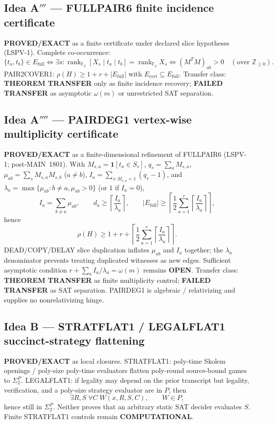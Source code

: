 \documentclass[11pt]{article}
\begin{document}
\subsection*{Idea A$'''$ --- FULLPAIR6 finite incidence certificate}
\textbf{PROVED/EXACT} as a finite certificate under declared slice hypotheses
(LSPV-1). Complete co-occurrence:
\[
\{t_a,t_b\}\in E_{\mathrm{full}}
\iff
\exists s:\operatorname{rank}_{\mathbb F_2}[X_s\mid t_a\mid t_b]
=\operatorname{rank}_{\mathbb F_2}X_s
\iff
(M^TM)_{ab}>0\quad(\text{over }\mathbb Z_{\ge 0}).
\]
PAIR2COVER1: $\rho(H)\ge 1+r+|E_{\mathrm{full}}|$ with
$E_{\mathrm{cert}}\subseteq E_{\mathrm{full}}$. Transfer class:
\textbf{THEOREM TRANSFER} only as finite incidence recovery;
\textbf{FAILED TRANSFER} as asymptotic $\omega(m)$ or unrestricted SAT separation.

\subsection*{Idea A$''''$ --- PAIRDEG1 vertex-wise multiplicity certificate}
\textbf{PROVED/EXACT} as a finite-dimensional refinement of FULLPAIR6 (LSPV-1;
post-MAIN~1801). With $M_{s,a}=\mathbf 1[t_a\in S_s]$,
$q_s=\sum_a M_{s,a}$, $\mu_{ab}=\sum_s M_{s,a}M_{s,b}$ ($a\neq b$),
$I_a=\sum_{s:M_{s,a}=1}(q_s-1)$, and
$\lambda_a=\max\{\mu_{ab}:b\neq a,\mu_{ab}>0\}$ (or $1$ if $I_a=0$),
\[
I_a=\sum_{b\neq a}\mu_{ab},\qquad
d_a\ge\left\lceil\frac{I_a}{\lambda_a}\right\rceil,\qquad
|E_{\mathrm{full}}|
\ge
\left\lceil
\frac12\sum_{a=1}^r
\left\lceil\frac{I_a}{\lambda_a}\right\rceil
\right\rceil,
\]
hence
\[
\rho(H)\ge
1+r+
\left\lceil
\frac12\sum_{a=1}^r
\left\lceil\frac{I_a}{\lambda_a}\right\rceil
\right\rceil.
\]
DEAD/COPY/DELAY slice duplication inflates $\mu_{ab}$ and $I_a$ together; the
$\lambda_a$ denominator prevents treating duplicated witnesses as new edges.
Sufficient asymptotic condition $r+\sum_a I_a/\lambda_a=\omega(m)$ remains
\textbf{OPEN}. Transfer class: \textbf{THEOREM TRANSFER} as finite multiplicity
control; \textbf{FAILED TRANSFER} as SAT separation. PAIRDEG1 is algebraic /
relativizing and supplies no nonrelativizing hinge.

\subsection*{Idea B --- STRATFLAT1 / LEGALFLAT1 succinct-strategy flattening}
\textbf{PROVED/EXACT} as local closures.
STRATFLAT1: poly-time Skolem openings / poly-size poly-time evaluators flatten
poly-round source-bound games to $\Sigma_2^P$.
LEGALFLAT1: if legality may depend on the prior transcript but legality,
verification, and a poly-size strategy evaluator are in $P$, then
\[
\exists R,S\;\forall C\;W(x,R,S,C),\qquad W\in P,
\]
hence still in $\Sigma_2^P$. Neither proves that an arbitrary static SAT decider
evaluates $S$. Finite STRATFLAT1 controls remain \textbf{COMPUTATIONAL}.
\end{document}
